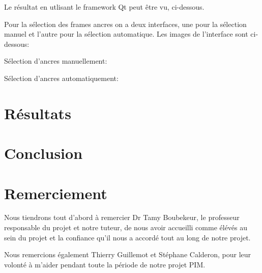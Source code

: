\documentclass[a4paper,10pt]{article}
\begin{document}
Le résultat en utlisant le framework Qt peut être vu, ci-dessous.

Pour la sélection des  frames ancres on a deux interfaces, une pour la sélection manuel et l’autre pour la sélection automatique. Les images de l’interface sont ci-dessous:

Sélection d'ancres manuellement: 

Sélection d'ancres automatiquement:


\section{Résultats}

\section{Conclusion}

\section{Remerciement}
Nous tiendrons tout d’abord à remercier Dr Tamy Boubekeur, le professeur responsable du projet et notre tuteur, de nous avoir accueilli comme élévés au sein du projet et la confiance qu’il nous a accordé tout au long de notre projet.

Nous remercions également Thierry Guillemot et Stéphane Calderon, pour leur volonté à m’aider pendant toute la période de notre projet PIM.

\nocite{Beeler:2010:HSC:1778765.1778777}
\nocite{Beeler:2011:HPF:2010324.1964970}

\begin{small}
  
\end{small}
\section*{}
\end{document}
